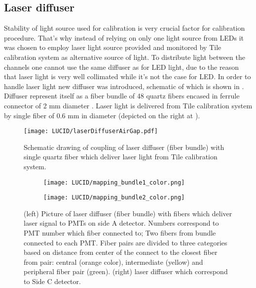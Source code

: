 
\subsection{Laser diffuser}
\label{subsec:laserDiffuser}


Stability of light source used for calibration is very crucial factor for calibration procedure.
That's why instead of relying on only one light source from LEDs it was chosen to employ laser light source 
provided and monitored by Tile calibration system \cite{atlasGeneral} as alternative source of light. 
To distribute light between the channels one cannot use the same diffuser as for LED light, 
due to the reason that laser light is very well collimated while it's not the case for LED.
In order to handle laser light new diffuser was introduced, schematic of which is shown in .
Diffuser represent itself as a fiber bundle of 48 quartz fibers encased in ferrule connector of 2 mm diameter .
Laser light is delivered from Tile calibration system by single fiber of 0.6 mm in diameter (depicted on the right at ).



\begin{figure}
\centering
\texttt{[image: LUCID/laserDiffuserAirGap.pdf]}
\caption{Schematic drawing of coupling of laser diffuser (fiber bundle) with single quartz fiber which deliver laser light from Tile calibration system.}
\label{fig:laserDiffuserSchematics}
\end{figure}

\begin{figure}
\centering
\begin{subfigure}{.45\textwidth}
  \centering
  \texttt{[image: LUCID/mapping\_bundle1\_color.png]}
\end{subfigure}%
\begin{subfigure}{.45\textwidth}
  \centering
  \texttt{[image: LUCID/mapping\_bundle2\_color.png]}
\end{subfigure}
\caption{(left) Picture of laser diffuser (fiber bundle) with fibers which deliver laser signal to PMTs on side A detector. Numbers correspond to PMT number 
which fiber connected to; 
Two fibers from bundle connected to each PMT. Fiber pairs are divided to three categories based on distance from center of the connect to the closest fiber 
from pair: 
central (orange color), intermediate (yellow) and peripheral fiber pair (green).
(right) laser diffuser which correspond to Side C detector.}
\label{fig:laserDiffuserMapping}
\end{figure}

